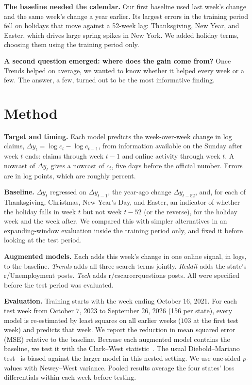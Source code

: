 \documentclass[sigconf,nonacm]{acmart}
\begin{document}
\textbf{The baseline needed the calendar.} Our first baseline used last week's change and
the same week's change a year earlier. Its largest errors in the training period fell on
holidays that move against a 52-week lag: Thanksgiving, New Year, and Easter, which drives
large spring spikes in New York. We added holiday terms, choosing them using the training
period only.

\textbf{A second question emerged: where does the gain come from?} Once Trends helped on
average, we wanted to know whether it helped every week or a few. The answer, a few, turned
out to be the most informative finding.

\section{Method}

\textbf{Target and timing.} Each model predicts the week-over-week change in log claims,
$\Delta y_t = \log c_t - \log c_{t-1}$, from information available on the Sunday after week
$t$ ends: claims through week $t-1$ and online activity through week $t$. A nowcast of
$\Delta y_t$ gives a nowcast of $c_t$, five days before the official number. Errors are in
log points, which are roughly percent.

\textbf{Baseline.} $\Delta y_t$ regressed on $\Delta y_{t-1}$, the year-ago change
$\Delta y_{t-52}$, and, for each of Thanksgiving, Christmas, New Year's Day, and Easter, an
indicator of whether the holiday falls in week $t$ but not week $t-52$ (or the reverse), for
the holiday week and the week after. We compared this with simpler alternatives in an
expanding-window evaluation inside the training period only, and fixed it before looking at
the test period.

\textbf{Augmented models.} Each adds this week's change in one online signal, in logs, to
the baseline. \emph{Trends} adds all three search terms jointly. \emph{Reddit} adds the
state's r/Unemployment posts. \emph{Tech} adds r/cscareerquestions posts. All were specified
before the test period was evaluated.

\textbf{Evaluation.} Training starts with the week ending October 16, 2021. For each test
week from October 7, 2023 to September 26, 2026 (156 per state), every model is re-estimated
by least squares on all earlier weeks ($103$ at the first test week) and predicts that week.
We report the reduction in mean squared error (MSE) relative to the baseline. Because each
augmented model contains the baseline, we test it with the Clark--West
statistic~\cite{clark2007approximately}. The usual Diebold--Mariano
test~\cite{diebold1995comparing} is biased against the larger model in this nested setting.
We use one-sided $p$-values with Newey--West variance. Pooled results average the four
states' loss differentials within each week before testing.
\end{document}
